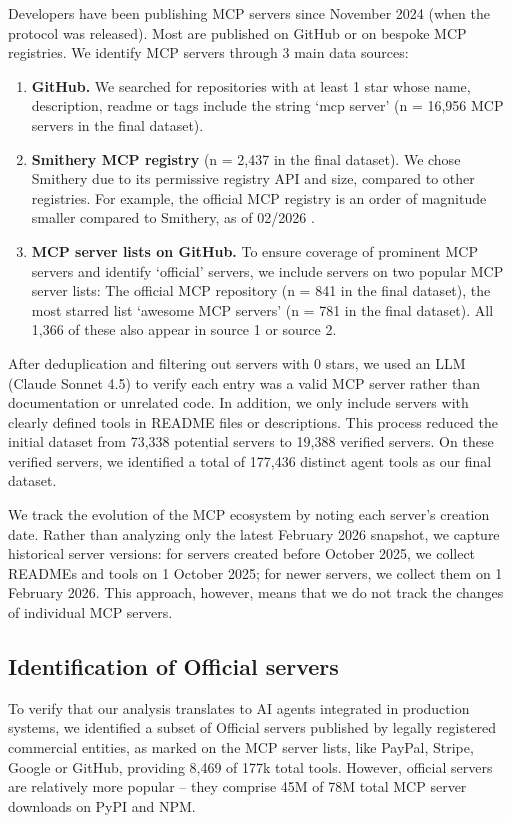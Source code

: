 \documentclass[manuscript,screen,nonacm,oneside]{acmart}
\begin{document}
Developers have been publishing MCP servers since November 2024 (when the protocol was released). Most are published on GitHub or on bespoke MCP registries. We identify MCP servers through 3 main data sources:

\begin{enumerate}
\def\labelenumi{\arabic{enumi}.}
\item
 \textbf{GitHub.} We searched for repositories with at least 1 star whose name, description, readme or tags include the string `mcp server' (n = 16,956 MCP servers in the final dataset).
\item
 \textbf{Smithery MCP registry} (n = 2,437 in the final dataset). We chose Smithery due to its permissive registry API and size, compared to other registries. For example, the official MCP registry is an order of magnitude smaller compared to Smithery, as of 02/2026 \citep{modelcontextprotocolOfficialRegistry}.
\item
 \textbf{MCP server lists on GitHub.} To ensure coverage of prominent MCP servers and identify `official' servers, we include servers on two popular MCP server lists: The official MCP repository \citep{githubGitHubModelcontextprotocolservers} (n = 841 in the final dataset), the most starred list `awesome MCP servers' \citep{archiveGitHubPunkpeyeawesomemcpservers} (n = 781 in the final dataset). All 1,366 of these also appear in source 1 or source 2.
\end{enumerate}

After deduplication and filtering out servers with 0 stars, we used an LLM (Claude Sonnet 4.5) to verify each entry was a valid MCP server rather than documentation or unrelated code. In addition, we only include servers with clearly defined tools in README files or descriptions. This process reduced the initial dataset from 73,338 potential servers to 19,388 verified servers. On these verified servers, we identified a total of 177,436 distinct agent tools as our final dataset.

We track the evolution of the MCP ecosystem by noting each server's creation date. Rather than analyzing only the latest February 2026 snapshot, we capture historical server versions: for servers created before October 2025, we collect READMEs and tools on 1 October 2025; for newer servers, we collect them on 1 February 2026. This approach, however, means that we do not track the changes of individual MCP servers.

\subsection{Identification of Official servers}
\label{sec:official-servers}
To verify that our analysis translates to AI agents integrated in production systems, we identified a subset of \textquotesingle Official\textquotesingle{} servers published by legally registered commercial entities, as marked on the MCP server lists, like PayPal, Stripe, Google or GitHub, providing 8,469 of 177k total tools. However, official servers are relatively more popular -- they comprise 45M of 78M total MCP server downloads on PyPI and NPM.
\end{document}
